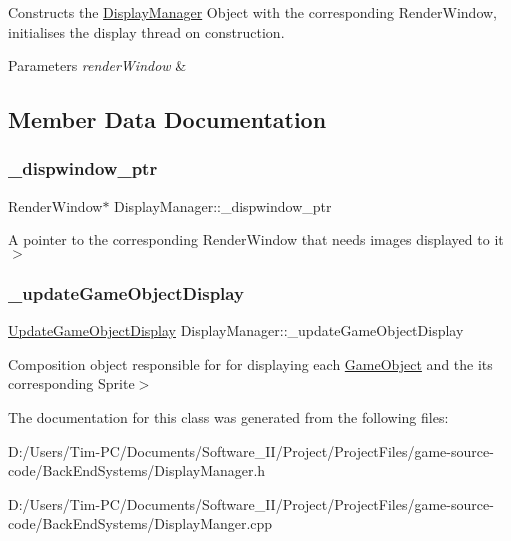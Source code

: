 Constructs the \hyperlink{class_display_manager}{Display\+Manager} Object with the corresponding Render\+Window, initialises the display thread on construction. 


\begin{DoxyParams}{Parameters}
{\em render\+Window} & \\
\hline
\end{DoxyParams}


\subsection{Member Data Documentation}
\mbox{\label{class_display_manager_abe0369d0fa6b544c77d9d50d50f949cf}} 
\subsubsection{\texorpdfstring{\+\_\+dispwindow\+\_\+ptr}{\_dispwindow\_ptr}}
{\footnotesize\ttfamily Render\+Window$\ast$ Display\+Manager\+::\+\_\+dispwindow\+\_\+ptr\hspace{0.3cm}{\ttfamily [private]}}

A pointer to the corresponding Render\+Window that needs images displayed to it$>$ \mbox{\label{class_display_manager_aee260bf088ffc55e21bd1ef282a139db}} 
\subsubsection{\texorpdfstring{\+\_\+update\+Game\+Object\+Display}{\_updateGameObjectDisplay}}
{\footnotesize\ttfamily \hyperlink{class_update_game_object_display}{Update\+Game\+Object\+Display} Display\+Manager\+::\+\_\+update\+Game\+Object\+Display\hspace{0.3cm}{\ttfamily [private]}}

Composition object responsible for for displaying each \hyperlink{class_game_object}{Game\+Object} and the its corresponding Sprite$>$ 

The documentation for this class was generated from the following files\+:\begin{DoxyCompactItemize}
\item 
D\+:/\+Users/\+Tim-\/\+P\+C/\+Documents/\+Software\+\_\+\+I\+I/\+Project/\+Project\+Files/game-\/source-\/code/\+Back\+End\+Systems/Display\+Manager.\+h\item 
D\+:/\+Users/\+Tim-\/\+P\+C/\+Documents/\+Software\+\_\+\+I\+I/\+Project/\+Project\+Files/game-\/source-\/code/\+Back\+End\+Systems/Display\+Manger.\+cpp\end{DoxyCompactItemize}
